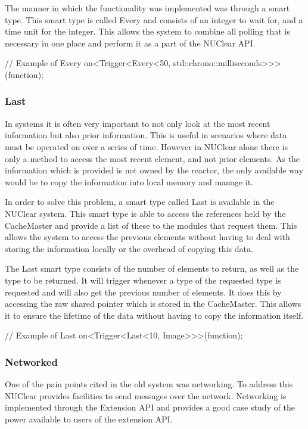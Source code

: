 \documentclass[english,12pt]{scrartcl}
\begin{document}
				The manner in which the functionality was implemented was through a smart type.
				This smart type is called Every and consists of an integer to wait for, and a time unit for the integer.
				This allows the system to combine all polling that is necessary in one place and perform it as a part of the NUClear API.
				
				\begin{cppcode}
				// Example of Every
				on<Trigger<Every<50, std::chrono::milliseconds>>>(function);
				\end{cppcode}	
				
			\subsubsection{Last}
				In systems it is often very important to not only look at the most recent information but also prior information.
				This is useful in scenarios where data must be operated on over a series of time.
				However in NUClear alone there is only a method to access the most recent element, and not prior elements.
				As the information which is provided is not owned by the reactor, the only available way would be to copy the information into local memory and manage it.
				
				In order to solve this problem, a smart type called Last is available in the NUClear system.
				This smart type is able to access the references held by the CacheMaster and provide a list of these to the modules that request them.
				This allows the system to access the previous elements without having to deal with storing the information locally or the overhead of copying this data.
				
				The Last smart type consists of the number of elements to return, as well as the type to be returned.
				It will trigger whenever a type of the requested type is requested and will also get the previous number of elements.
				It does this by accessing the raw shared pointer which is stored in the CacheMaster.
				This allows it to ensure the lifetime of the data without having to copy the information itself.
				
				\begin{cppcode}
				// Example of Last
				on<Trigger<Last<10, Image>>>(function);
				\end{cppcode}
	
			\subsubsection{Networked}
				One of the pain points cited in the old system was networking. 
				To address this NUClear provides facilities to send messages over the network.
				Networking is implemented through the Extension API and provides a good case study of the power available to users of the extension API.
				
\end{document}
